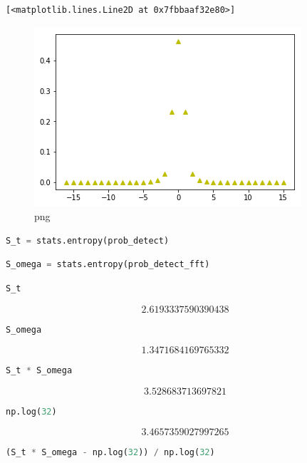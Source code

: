 \begin{lstlisting}
[<matplotlib.lines.Line2D at 0x7fbbaaf32e80>]
\end{lstlisting}

\begin{figure}
\centering
\includegraphics[width=0.66\linewidth]{output_95_1.png}
\caption[]{png}
\end{figure}

\begin{lstlisting}[language=Python]
S_t = stats.entropy(prob_detect)
\end{lstlisting}

\begin{lstlisting}[language=Python]
S_omega = stats.entropy(prob_detect_fft)
\end{lstlisting}

\begin{lstlisting}[language=Python]
S_t
\end{lstlisting}

\[2.6193337590390438\]

\begin{lstlisting}[language=Python]
S_omega
\end{lstlisting}

\[1.3471684169765332\]

\begin{lstlisting}[language=Python]
S_t * S_omega
\end{lstlisting}

\[3.528683713697821\]

\begin{lstlisting}[language=Python]
np.log(32)
\end{lstlisting}

\[3.4657359027997265\]

\begin{lstlisting}[language=Python]
(S_t * S_omega - np.log(32)) / np.log(32)
\end{lstlisting}

